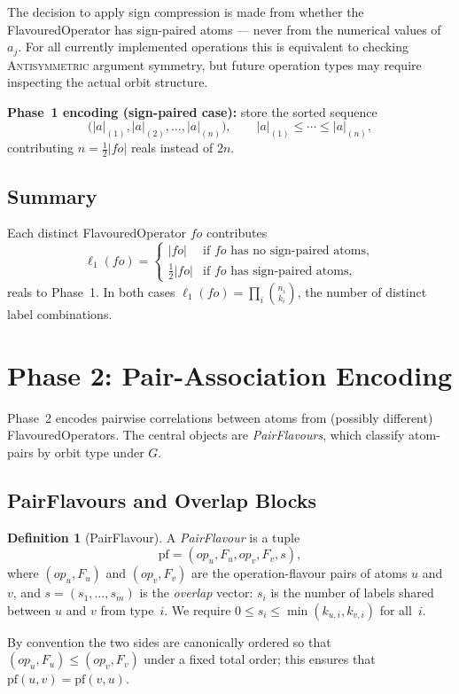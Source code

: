\documentclass[11pt,a4paper]{article}
\theoremstyle{definition}
\newtheorem{definition}{Definition}[section]
\theoremstyle{plain}
\theoremstyle{remark}
\newcommand{\pf}{\mathrm{pf}}
\newcommand{\comb}[2]{\binom{#1}{#2}}
\begin{document}
The decision to apply sign compression is made from whether the
FlavouredOperator has sign-paired atoms — never from the numerical values of
$a_j$.  For all currently implemented operations this is equivalent to
checking \textsc{Antisymmetric} argument symmetry, but future operation types
may require inspecting the actual orbit structure.

\textbf{Phase~1 encoding (sign-paired case):} store the sorted sequence
\[
  \bigl(|a|_{(1)}, |a|_{(2)}, \ldots, |a|_{(n)}\bigr),
  \qquad |a|_{(1)} \le \cdots \le |a|_{(n)},
\]
contributing $n = \frac{1}{2}|\mathit{fo}|$ reals instead of $2n$.

\subsection{Summary}

Each distinct FlavouredOperator $\mathit{fo}$ contributes
\begin{equation}\label{eq:phase1-length}
  \ell_1(\mathit{fo}) =
  \begin{cases}
    |\mathit{fo}| & \text{if $\mathit{fo}$ has no sign-paired atoms},\\
    \tfrac{1}{2}|\mathit{fo}| & \text{if $\mathit{fo}$ has sign-paired atoms},
  \end{cases}
\end{equation}
reals to Phase~1.  In both cases $\ell_1(\mathit{fo}) = \prod_i \comb{n_i}{k_i}$,
the number of distinct label combinations.

\section{Phase 2: Pair-Association Encoding}

Phase~2 encodes pairwise correlations between atoms from (possibly different)
FlavouredOperators.  The central objects are \emph{PairFlavours}, which classify
atom-pairs by orbit type under $G$.

\subsection{PairFlavours and Overlap Blocks}

\begin{definition}[PairFlavour]
A \emph{PairFlavour} is a tuple
\[
  \pf = (\mathit{op}_u, F_u, \mathit{op}_v, F_v, s),
\]
where $(op_u, F_u)$ and $(\mathit{op}_v, F_v)$ are the operation-flavour pairs
of atoms $u$ and~$v$, and $s = (s_1,\ldots,s_m)$ is the \emph{overlap} vector:
$s_i$ is the number of labels shared between $u$ and $v$ from type~$i$.
We require $0 \le s_i \le \min(k_{u,i}, k_{v,i})$ for all~$i$.

By convention the two sides are canonically ordered so that $(\mathit{op}_u,
F_u) \le (\mathit{op}_v, F_v)$ under a fixed total order; this ensures that
$\pf(u,v) = \pf(v,u)$.
\end{definition}
\end{document}
